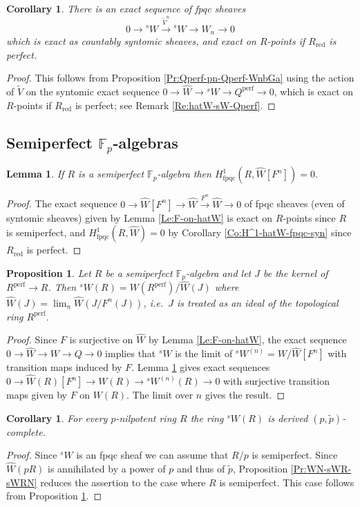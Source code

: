 \documentclass[a4paper,11pt]{amsart}
\theoremstyle{plain}
\newtheorem{Lemma}[equation]{Lemma}
\newtheorem{Prop}[equation]{Proposition}
\newtheorem{Cor}[equation]{Corollary}
\theoremstyle{definition}
\theoremstyle{remark}
\newcommand{\bLe}{\begin{Lemma}}
\newcommand{\eLe}{\end{Lemma}}
\newcommand{\bPr}{\begin{Prop}}
\newcommand{\ePr}{\end{Prop}}
\newcommand{\bCo}{\begin{Cor}}
\newcommand{\eCo}{\end{Cor}}
\newcommand{\bproof}{\begin{proof}}
\newcommand{\eproof}{\end{proof}}
\newcommand{\beqn}{\begin{equation}}
\newcommand{\eeqn}{\end{equation}}
\numberwithin{equation}{section}
\newcommand{\FF}{{\mathbb{F}}}
\DeclareMathOperator{\fpqc}{fpqc}
\DeclareMathOperator{\perf}{perf}
\DeclareMathOperator{\red}{red}
\newcommand{\limperf}{^{\perf}}
\newcommand{\sW}{{}^sW}
\begin{document}
\bCo
\label{Co:sW-Vn-sW-Wn}
There is an exact sequence of fpqc sheaves
\beqn
\label{Eq:sW-Vn-sW-Wn}
0 \to \sW \xrightarrow{\tilde V^n} \sW \to W_n \to 0
\eeqn
which is exact as countably syntomic sheaves, and exact on $R$-points if $R_{\red}$ is perfect.
\eCo

\bproof
This follows from Proposition \ref{Pr:Qperf-pn-Qperf-WnbGa} using the action of $\tilde V$ on the syntomic exact sequence $0\to\hat W\to\sW\to Q\limperf\to 0$, which is exact on $R$-points if $R_{\red}$ is perfect; see Remark \ref{Re:hatW-sW-Qperf}.
\eproof

\subsection{Semiperfect $\FF_p$-algebras}

\bLe
\label{Le:H1-hW-semiperf}
If $R$ is a semiperfect $\FF_p$-algebra then $H^1_{\fpqc}(R,\hat W[{F^n}])=0$.
\eLe

\bproof
The exact sequence $0\to\hat W[{F^n}]\to \hat W\xrightarrow{F^n}\hat W\to 0$ of fpqc sheaves (even of syntomic sheaves) given by Lemma \ref{Le:F-on-hatW} is exact on $R$-points since $R$ is semiperfect, and $H^1_{\fpqc}(R,\hat W)=0$ by Corollary \ref{Co:H^1-hatW-fpqc-syn} since $R_{\red}$ is perfect.
\eproof

\bPr
\label{Pr:sW-semiperf}
Let $R$ be a semiperfect $\FF_p$-algebra and let $J$ be the kernel of $R\limperf\to R$. Then $\sW(R)=W(R\limperf)/\hat W(J)$ where $\hat W(J)=\lim_n\hat W(J/F^n(J))$, i.e.\ $J$ is treated as an ideal of the topological ring $R\limperf$.
\ePr

\bproof
Since $F$ is surjective on $\hat W$ by Lemma \ref{Le:F-on-hatW}, the exact sequence $0\to\hat W\to W\to Q\to 0$ implies that 
$\sW$ is the limit of $\sW^{(n)}=W/\hat W[F^n]$ with transition maps induced by $F$. Lemma \ref{Le:H1-hW-semiperf} gives exact sequences $0\to\hat W(R)[F^n]\to W(R)\to\sW^{(n)}(R)\to 0$ with surjective transition maps given by $F$ on $W(R)$. The limit over $n$ gives the result.
\eproof

\bCo
\label{Co:sW-p-complete}
For every $p$-nilpotent ring $R$ the ring $\sW(R)$ is derived $(p,\tilde p)$-complete.
\eCo

\bproof
Since $\sW$ is an fpqc sheaf we can assume that $R/p$ is semiperfect. Since $\hat W(pR)$ is annihilated by a power of $p$ and thus of $\tilde p$, Proposition \ref{Pr:WN-sWR-sWRN} reduces the assertion to the case where $R$ is semiperfect. This case follows from Proposition \ref{Pr:sW-semiperf}. 
\eproof
\end{document}
